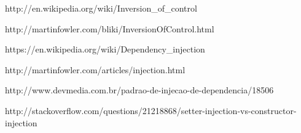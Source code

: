 \begin{thebibliography}{99} %

http://en.wikipedia.org/wiki/Inversion\_of\_control

http://martinfowler.com/bliki/InversionOfControl.html

https://en.wikipedia.org/wiki/Dependency\_injection

http://martinfowler.com/articles/injection.html

http://www.devmedia.com.br/padrao-de-injecao-de-dependencia/18506

http://stackoverflow.com/questions/21218868/setter-injection-vs-constructor-injection

\end{thebibliography}
